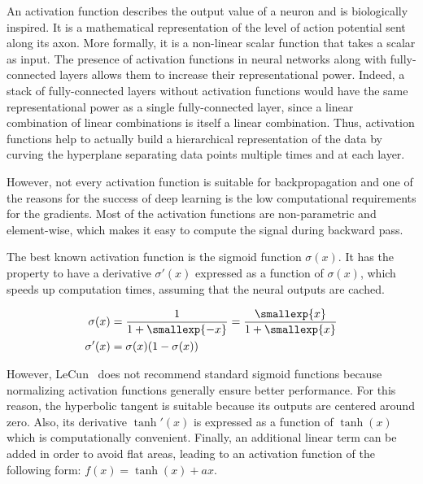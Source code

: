         An activation function describes the output value of a neuron and is biologically inspired. It is a mathematical representation
        of the level of action potential sent along its axon. More formally, it is a non-linear scalar function that takes a scalar as input.
        The presence of activation functions in neural networks along with fully-connected layers allows them to increase their representational
        power. Indeed, a stack of fully-connected layers without activation functions would have the same representational power as a single
        fully-connected layer, since a linear combination of linear combinations is itself a linear combination. Thus, activation functions
        help to actually build a hierarchical representation of the data by curving the hyperplane separating data points multiple times  %
        and at each layer.

        However, not every activation function is suitable for backpropagation and one of the reasons for the success of deep learning is the low
        computational requirements for the gradients. Most of the activation functions are non-parametric and element-wise, which makes it easy
        to compute the signal during backward pass.

        The best known activation function is the sigmoid function $\sigma(x)$.
        It has the property to have a derivative $\sigma'(x)$ expressed as a function of $\sigma(x)$,
        which speeds up computation times, assuming that the neural outputs are cached.

        \begin{equation}
            \begin{split}
                \sigma(x) & = \frac{1}{1 + \smallexp{-x}} = \frac{\smallexp{x}}{1 + \smallexp{x}} \\
                \sigma'(x) & = \sigma(x) (1 - \sigma(x))
            \end{split}
        \end{equation}

        However, LeCun~\cite{efficientBackprop} does not recommend standard sigmoid functions because normalizing
        activation functions generally ensure better performance.
        For this reason, the hyperbolic tangent is suitable because its outputs are centered around zero.
        Also, its derivative $\tanh'(x)$ is expressed as a function of $\tanh(x)$ which is computationally convenient.
        Finally, an additional linear term can be added in order to
        avoid flat areas, leading to an activation function of the following form: $f(x) = \tanh(x) + ax$.

